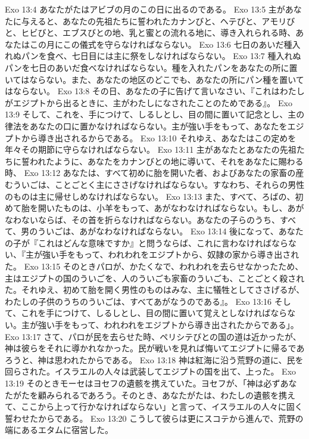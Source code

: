 Exo 13:4  あなたがたはアビブの月のこの日に出るのである。
Exo 13:5  主があなたに与えると、あなたの先祖たちに誓われたカナンびと、ヘテびと、アモリびと、ヒビびと、エブスびとの地、乳と蜜との流れる地に、導き入れられる時、あなたはこの月にこの儀式を守らなければならない。
Exo 13:6  七日のあいだ種入れぬパンを食べ、七日目には主に祭をしなければならない。
Exo 13:7  種入れぬパンを七日のあいだ食べなければならない。種を入れたパンをあなたの所に置いてはならない。また、あなたの地区のどこでも、あなたの所にパン種を置いてはならない。
Exo 13:8  その日、あなたの子に告げて言いなさい、『これはわたしがエジプトから出るときに、主がわたしになされたことのためである』。
Exo 13:9  そして、これを、手につけて、しるしとし、目の間に置いて記念とし、主の律法をあなたの口に置かなければならない。主が強い手をもって、あなたをエジプトから導き出されるからである。
Exo 13:10  それゆえ、あなたはこの定めを年々その期節に守らなければならない。
Exo 13:11  主があなたとあなたの先祖たちに誓われたように、あなたをカナンびとの地に導いて、それをあなたに賜わる時、
Exo 13:12  あなたは、すべて初めに胎を開いた者、およびあなたの家畜の産むういごは、ことごとく主にささげなければならない。すなわち、それらの男性のものは主に帰せしめなければならない。
Exo 13:13  また、すべて、ろばの、初めて胎を開いたものは、小羊をもって、あがなわなければならない。もし、あがなわないならば、その首を折らなければならない。あなたの子らのうち、すべて、男のういごは、あがなわなければならない。
Exo 13:14  後になって、あなたの子が『これはどんな意味ですか』と問うならば、これに言わなければならない、『主が強い手をもって、われわれをエジプトから、奴隷の家から導き出された。
Exo 13:15  そのときパロが、かたくなで、われわれを去らせなかったため、主はエジプトの国のういごを、人のういごも家畜のういごも、ことごとく殺された。それゆえ、初めて胎を開く男性のものはみな、主に犠牲としてささげるが、わたしの子供のうちのういごは、すべてあがなうのである』。
Exo 13:16  そして、これを手につけて、しるしとし、目の間に置いて覚えとしなければならない。主が強い手をもって、われわれをエジプトから導き出されたからである」。
Exo 13:17  さて、パロが民を去らせた時、ペリシテびとの国の道は近かったが、神は彼らをそれに導かれなかった。民が戦いを見れば悔いてエジプトに帰るであろうと、神は思われたからである。
Exo 13:18  神は紅海に沿う荒野の道に、民を回らされた。イスラエルの人々は武装してエジプトの国を出て、上った。
Exo 13:19  そのときモーセはヨセフの遺骸を携えていた。ヨセフが、「神は必ずあなたがたを顧みられるであろう。そのとき、あなたがたは、わたしの遺骸を携えて、ここから上って行かなければならない」と言って、イスラエルの人々に固く誓わせたからである。
Exo 13:20  こうして彼らは更にスコテから進んで、荒野の端にあるエタムに宿営した。
